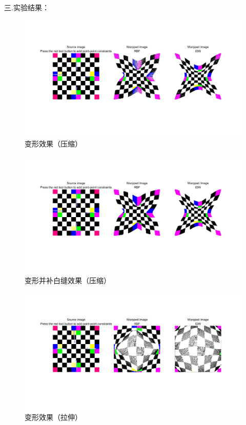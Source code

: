 \documentclass[a4paper]{ltxdoc}
\begin{document}
三.实验结果：
\begin{figure}[htb]
  \centering
  \includegraphics[width=1.0\textwidth]{fig1.jpg}
  \caption{变形效果（压缩）}
  \label{fig:fig-1}
\end{figure}

\begin{figure}[htb]
  \centering
  \includegraphics[width=1.0\textwidth]{fig12.jpg}
  \caption{变形并补白缝效果（压缩）}
  \label{fig:fig-2}
\end{figure}

\begin{figure}[htb]
  \centering
  \includegraphics[width=1.0\textwidth]{fig2.jpg}
  \caption{变形效果（拉伸）}
  \label{fig:fig-3}
\end{figure}
\end{document}
